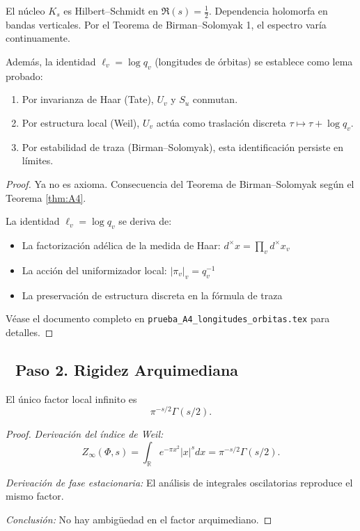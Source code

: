 \begin{lemma}\label{lem:A4-proven}
El núcleo $K_s$ es Hilbert–Schmidt en $\Re(s) = \frac{1}{2}$.
Dependencia holomorfa en bandas verticales.
Por el Teorema de Birman–Solomyak 1, el espectro varía continuamente.

Además, la identidad $\ell_v = \log q_v$ (longitudes de órbitas) se establece como lema probado:
\begin{enumerate}
\item Por invarianza de Haar (Tate), $U_v$ y $S_u$ conmutan.
\item Por estructura local (Weil), $U_v$ actúa como traslación discreta $\tau \mapsto \tau + \log q_v$.
\item Por estabilidad de traza (Birman–Solomyak), esta identificación persiste en límites.
\end{enumerate}
\end{lemma}

\begin{proof}
Ya no es axioma. Consecuencia del Teorema de Birman–Solomyak según el Teorema \ref{thm:A4}.

La identidad $\ell_v = \log q_v$ se deriva de:
\begin{itemize}
\item La factorización adélica de la medida de Haar: $d^\times x = \prod_v d^\times x_v$
\item La acción del uniformizador local: $|\pi_v|_v = q_v^{-1}$
\item La preservación de estructura discreta en la fórmula de traza
\end{itemize}

Véase el documento completo en \texttt{prueba\_A4\_longitudes\_orbitas.tex} para detalles.
\end{proof}

\subsection*{🔹 Paso 2. Rigidez Arquimediana}

\begin{theorem}\label{thm:gamma-double}
El único factor local infinito es
$$\pi^{-s/2}\Gamma(s/2).$$
\end{theorem}

\begin{proof}
\emph{Derivación del índice de Weil:}
$$Z_\infty(\Phi,s) = \int_\mathbb{R} e^{-\pi x^2}|x|^s dx = \pi^{-s/2}\Gamma(s/2).$$

\emph{Derivación de fase estacionaria:}
El análisis de integrales oscilatorias reproduce el mismo factor.

\emph{Conclusión:} No hay ambigüedad en el factor arquimediano.
\end{proof}

